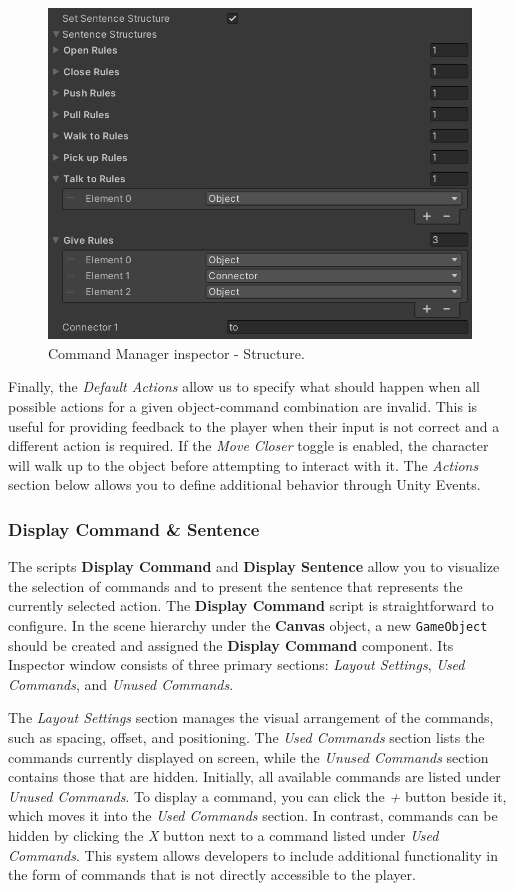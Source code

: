\begin{figure}[H]
\centering
\includegraphics[width=.8\linewidth]{img/User doc/image_2025-07-04_203654317.png}
\caption{Command Manager inspector - Structure.}
\label{fig:Manual-CM3}
\end{figure}

Finally, the \textit{Default Actions} allow us to specify what should happen when all possible actions for a given object-command combination are invalid. This is useful for providing feedback to the player when their input is not correct and a different action is required. If the \textit{Move Closer} toggle is enabled, the character will walk up to the object before attempting to interact with it. The \textit{Actions} section below allows you to define additional behavior through Unity Events.

\subsubsection{Display Command \& Sentence }
\label{Manual:Display-C&S}
The scripts \textbf{Display Command} and \textbf{Display Sentence} allow you to visualize the selection of commands and to present the sentence that represents the currently selected action. The \textbf{Display Command} script is straightforward to configure. In the scene hierarchy under the \textbf{Canvas} object, a new \verb|GameObject| should be created and assigned the \textbf{Display Command} component. Its Inspector window consists of three primary sections: \textit{Layout Settings}, \textit{Used Commands}, and \textit{Unused Commands}.

The \textit{Layout Settings} section manages the visual arrangement of the commands, such as spacing, offset, and positioning. The \textit{Used Commands} section lists the commands currently displayed on screen, while the \textit{Unused Commands} section contains those that are hidden. Initially, all available commands are listed under \textit{Unused Commands}. To display a command, you can click the \textit{+} button beside it, which moves it into the \textit{Used Commands} section. In contrast, commands can be hidden by clicking the \textit{X} button next to a command listed under \textit{Used Commands}. This system allows developers to include additional functionality in the form of commands that is not directly accessible to the player.

